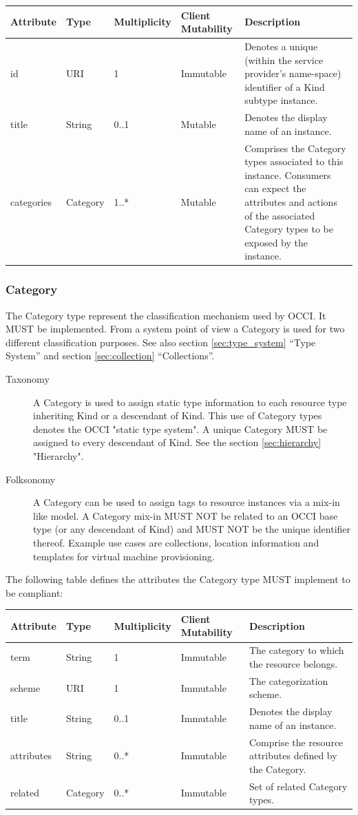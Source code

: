 \documentclass[10pt,a4paper,british]{article}
\begin{document}
\begin{tabular}{l|l|l|l|p{2.7in}}
Attribute & Type & Multiplicity & Client Mutability & Description \\
\hline
id & URI & 1 & Immutable & Denotes a unique (within the service provider's name-space) identifier of a Kind subtype instance. \\
title & String & 0..1 & Mutable & Denotes the display name of an instance. \\
categories & Category & 1..* & Mutable\footnotemark[1] & Comprises the Category types associated to this instance. Consumers can expect the attributes and actions of the associated Category types to be exposed by the instance. \\ 
\end{tabular}
\addtocounter{footnote}{1}

\subsubsection{Category}
The Category type represent the classification mechanism used by
OCCI. It MUST be implemented. From a system point of view a Category
is used for two different classification purposes. See also section
\ref{sec:type_system} ``Type System'' and section \ref{sec:collection}
``Collections''.

\begin{description}
\item[Taxonomy] A Category is used to assign static type information
  to each resource type inheriting Kind or a descendant of Kind. This
  use of Category types denotes the OCCI "static type system". A
  unique Category MUST be assigned to every descendant of Kind. See
  the section \ref{sec:hierarchy} "Hierarchy".
\item[Folksonomy] A Category can be used to assign tags to resource
  instances via a mix-in like model. A Category mix-in MUST NOT be
  related to an OCCI base type (or any descendant of Kind) and MUST
  NOT be the unique identifier thereof.  Example use cases are
  collections, location information and templates for virtual machine
  provisioning.
\end{description}

The following table defines the attributes the Category type MUST
implement to be compliant:

\begin{tabular}{l|l|l|l|p{2.7in}}
Attribute & Type & Multiplicity & Client Mutability & Description \\
\hline
term & String & 1 & Immutable & The category to which the resource belongs. \\
scheme & URI & 1 & Immutable & The categorization scheme. \\
title & String & 0..1 & Immutable & Denotes the display name of an instance. \\
attributes & String & 0..* & Immutable & Comprise the resource attributes defined by the Category. \\
related & Category & 0..* & Immutable & Set of related Category types. \\
\end{tabular}
\end{document}
